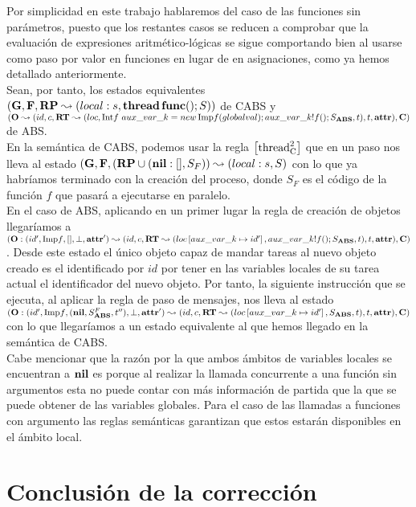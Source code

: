 Por simplicidad en este trabajo hablaremos del caso de las funciones sin parámetros, puesto que los restantes casos se reducen a comprobar que la evaluación de expresiones aritmético-lógicas se sigue comportando bien al usarse como paso por valor en funciones en lugar de en asignaciones, como ya hemos detallado anteriormente.\\

Sean, por tanto, los estados equivalentes $(\mathbf{G}, \mathbf{F}, \textbf{RP} \leadsto (local:s, \textbf{thread} \,\textbf{func}()\mbox{;\,}S))$ de CABS y $(\mathbf{O} \leadsto (id, c, \textbf{RT} \leadsto (loc,  \mbox{Int$f$ } aux\_var\_k = new\, \mbox{Imp$f$}(globalval)\mbox{;\,} aux\_var\_k!f()\mbox{;\,} S_{\textbf{ABS}}, t), t, \textbf{attr}), \mathbf{C})$ de ABS.\\

En la semántica de CABS, podemos usar la regla $\left[ \text{thread}_{\text{C}}^2 \right]$ que en un paso nos lleva al estado $(\mathbf{G}, \mathbf{F}, (\textbf{RP} \cup (\textbf{nil}:[], S_F)) \leadsto (local:s, S)$ con lo que ya habríamos terminado con la creación del proceso, donde $S_F$ es el código de la función $f$ que pasará a ejecutarse en paralelo.\\

En el caso de ABS, aplicando en un primer lugar la regla de creación de objetos llegaríamos a $(\mathbf{O}:(id', \mbox{Imp$f$}, [], \perp, \textbf{attr}') \leadsto (id, c, \textbf{RT} \leadsto (loc \left[ aux\_var\_k\mapsto id' \right], aux\_var\_k!f()\mbox{;\,} S_{\textbf{ABS}}, t), t, \textbf{attr}), \mathbf{C})$. Desde este estado el único objeto capaz de mandar tareas al nuevo objeto creado es el identificado por $id$ por tener en las variables locales de su tarea actual el identificador del nuevo objeto. Por tanto, la siguiente instrucción que se ejecuta, al aplicar la regla de paso de mensajes, nos lleva al estado $(\mathbf{O}:(id', \mbox{Imp$f$}, (\textbf{nil}, S_{\textbf{ABS}}^F, t''), \perp, \textbf{attr}') \leadsto (id, c, \textbf{RT} \leadsto (loc \left[ aux\_var\_k\mapsto id' \right], S_{\textbf{ABS}}, t), t, \textbf{attr}), \mathbf{C})$ con lo que llegaríamos a un estado equivalente al que hemos llegado en la semántica de CABS.\\

Cabe mencionar que la razón por la que ambos ámbitos de variables locales se encuentran a $\textbf{nil}$ es porque al realizar la llamada concurrente a una función sin argumentos esta no puede contar con más información de partida que la que se puede obtener de las variables globales. Para el caso de las llamadas a funciones con argumento las reglas semánticas garantizan que estos estarán disponibles en el ámbito local.

\section{Conclusión de la corrección}

